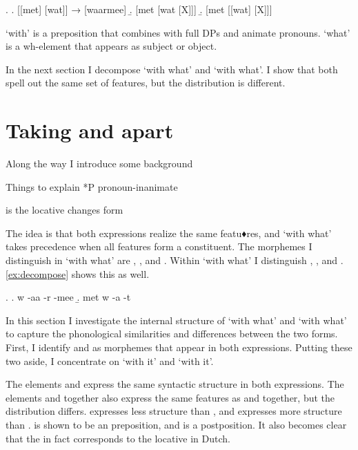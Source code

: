 \documentclass[12pt]{article}
\begin{document}
\ex.\label{ex:summaryconst}
\a. [[met] [wat]] → [waarmee]\label{ex:waarmeefr}
\b. [met [wat [X]]]
\b. [met [[wat] [X]]]\label{ex:metwatfr}

 `with' is a preposition that combines with full DPs and animate pronouns.  `what' is a wh-element that appears as subject or object.

In the next section I decompose  `with what' and  `with what'. I show that both spell out the same set of features, but the distribution is different.



\section{Taking  and  apart}

Along the way I introduce some background

Things to explain
*P pronoun-inanimate

 is the locative
 changes form

 The idea is that both expressions realize the same featu♦res, and  `with what' takes precedence when all features form a constituent. The morphemes I distinguish in  `with what' are , ,  and . Within  `with what' I distinguish , ,  and . \ref{ex:decompose} shows this as well.

\ex.\label{ex:decompose}
\a. w -aa -r -mee
\b. met w -a -t

In this section I investigate the internal structure of  `with what' and  `with what' to capture the phonological similarities and differences between the two forms. First, I identify  and  as morphemes that appear in both expressions. Putting these two aside, I concentrate on  `with it' and  `with it'.

The elements  and  express the same syntactic structure in both expressions. The elements  and  together also express the same features as  and  together, but the distribution differs.  expresses less structure than , and  expresses more structure than .  is shown to be an preposition, and  is a postposition. It also becomes clear that the  in fact corresponds to the locative  in Dutch.
\end{document}
